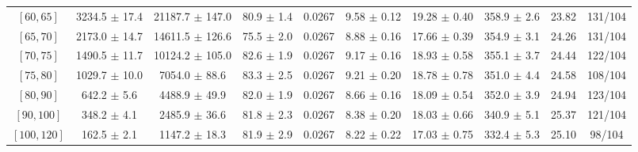 \begin{tabular}{c||c|c|c|c|c|c|c||c|c}
$[60, 65]$ & 3234.5 $\pm$ 17.4 & 21187.7 $\pm$ 147.0 & 80.9 $\pm$ 1.4 & 0.0267 & 9.58 $\pm$ 0.12 & 19.28 $\pm$ 0.40 & 358.9 $\pm$ 2.6 & 23.82 & 131/104\\
$[65, 70]$ & 2173.0 $\pm$ 14.7 & 14611.5 $\pm$ 126.6 & 75.5 $\pm$ 2.0 & 0.0267 & 8.88 $\pm$ 0.16 & 17.66 $\pm$ 0.39 & 354.9 $\pm$ 3.1 & 24.26 & 131/104\\
$[70, 75]$ & 1490.5 $\pm$ 11.7 & 10124.2 $\pm$ 105.0 & 82.6 $\pm$ 1.9 & 0.0267 & 9.17 $\pm$ 0.16 & 18.93 $\pm$ 0.58 & 355.1 $\pm$ 3.7 & 24.44 & 122/104\\
$[75, 80]$ & 1029.7 $\pm$ 10.0 & 7054.0 $\pm$ 88.6 & 83.3 $\pm$ 2.5 & 0.0267 & 9.21 $\pm$ 0.20 & 18.78 $\pm$ 0.78 & 351.0 $\pm$ 4.4 & 24.58 & 108/104\\
$[80, 90]$ & 642.2 $\pm$ 5.6 & 4488.9 $\pm$ 49.9 & 82.0 $\pm$ 1.9 & 0.0267 & 8.66 $\pm$ 0.16 & 18.09 $\pm$ 0.54 & 352.0 $\pm$ 3.9 & 24.94 & 123/104\\
$[90, 100]$ & 348.2 $\pm$ 4.1 & 2485.9 $\pm$ 36.6 & 81.8 $\pm$ 2.3 & 0.0267 & 8.38 $\pm$ 0.20 & 18.03 $\pm$ 0.66 & 340.9 $\pm$ 5.1 & 25.37 & 121/104\\
$[100, 120]$ & 162.5 $\pm$ 2.1 & 1147.2 $\pm$ 18.3 & 81.9 $\pm$ 2.9 & 0.0267 & 8.22 $\pm$ 0.22 & 17.03 $\pm$ 0.75 & 332.4 $\pm$ 5.3 & 25.10 & 98/104\\
\end{tabular}
